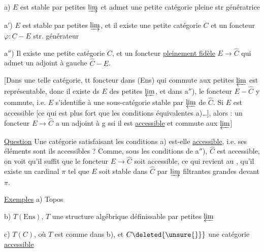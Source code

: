 a)  $E$ est stable par petites $\varinjlim$ et admet une petite catégorie pleine str génératrice

a$'$) $E$ est stable par petites $\varinjlim$, et il existe une petite catégorie $C$ et un foncteur $\varphi:C\mathbin{-}E$ str. générateur

a$''$) Il existe une petite catégorie $C$, et un foncteur \uline{pleinement fidèle} $E\to\widehat C$ qui admet un adjoint à gauche $\widehat C\mathbin{-}E$.

[Dans une telle catégorie, tt foncteur  dans (Ens) qui commute aux petites $\varprojlim$ est représentable, donc il existe ds $E$ des petites $\varprojlim$, et dans a$''$), le foncteur $E\mathbin{-}\widehat C$ y commute, i.e. $E$ s'identifie à une sous-catégorie stable par $\varprojlim$ de $\widehat C$. Si $E$ est accessible [ce qui est plus fort que les conditions équivalentes a)\ldots], alors :  un foncteur $E\to\widehat C$ a un adjoint à g ssi il est \uline{accessible} et commute aux  $\varprojlim$]

 \uline{Question} Une catégorie satisfaisant les conditions a) est-elle \uline{accessible}, i.e. ses éléments sont ils accessibles ? Comme, sous les conditions de a$''$), $\widehat C$ est accessible, on voit qu'il  suffit que le foncteur $E\to\widehat C$ soit accessible,  ce qui revient au , qu'il existe un cardinal $\pi$ tel que $E$ soit stable dans $\widehat C$ par $\varinjlim$ filtrantes grandes devant $\pi$.


\uline{Exemples} a) Topos  

b) $T(\mathrm{Ens})$, $T$ une structure algébrique définissable par petites $\varprojlim$

c) $T(C)$, où $T$ est comme dans b), et $C\deleted{\unsure{\}}}$ une catégorie \uline{accessible}



